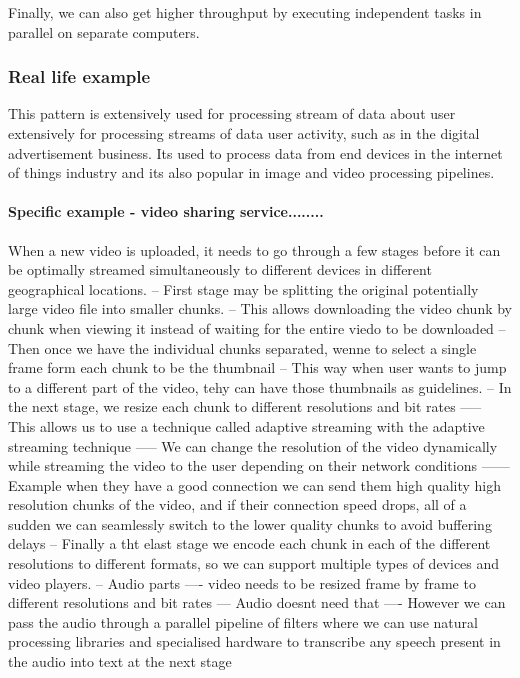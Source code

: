\documentclass[a4paper, 11pt]{book}
\begin{document}
    Finally, we can also get higher throughput by executing independent tasks in parallel on separate computers.

    \subsubsection{Real life example}
    This pattern is extensively used for processing stream of data about user extensively for processing streams of data user activity, such as in the digital advertisement business.
    Its used to process data from end devices in the internet of things industry and its also popular in image and video processing pipelines.

    \paragraph{Specific example - video sharing service........}
    When a new video is uploaded, it needs to go through a few stages before it can be optimally streamed simultaneously to different devices in different geographical locations.
    -- First stage may be splitting the original potentially large video file into smaller chunks.
    -- This allows downloading the video chunk by chunk when viewing it instead of waiting for the entire viedo to be downloaded
    -- Then once we have the individual chunks separated, wenne to select a single frame form each chunk to be the thumbnail
    -- This way when user wants to jump to a different part of the video, tehy can have those thumbnails as guidelines.
    -- In the next stage, we resize each chunk to different resolutions and bit rates
    ----- This allows us to use a technique called adaptive streaming with the adaptive streaming technique
    ----- We can change the resolution of the video dynamically while streaming the video to the user depending on their network conditions
    ------ Example when they have a good connection we can send them high quality high resolution chunks of the video, and if their connection speed drops, all of a sudden we can seamlessly switch to the lower quality chunks to avoid buffering delays
    -- Finally a tht elast stage we encode each chunk in each of the different resolutions to different formats, so we can support multiple types of devices and video players.
    -- Audio parts
    ---- video needs to be resized frame by frame to different resolutions and bit rates
    --- Audio doesnt need that
    ---- However we can pass the audio through a parallel pipeline of filters where we can use natural processing libraries and specialised hardware to transcribe any speech present in the audio into text at the next stage
\end{document}
